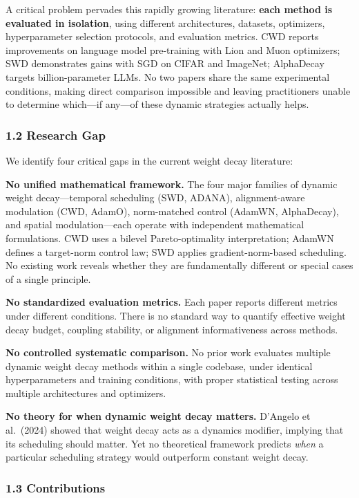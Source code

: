 \documentclass[
]{article}
\begin{document}
A critical problem pervades this rapidly growing literature:
\textbf{each method is evaluated in isolation}, using different
architectures, datasets, optimizers, hyperparameter selection protocols,
and evaluation metrics. CWD reports improvements on language model
pre-training with Lion and Muon optimizers; SWD demonstrates gains with
SGD on CIFAR and ImageNet; AlphaDecay targets billion-parameter LLMs. No
two papers share the same experimental conditions, making direct
comparison impossible and leaving practitioners unable to determine
which---if any---of these dynamic strategies actually helps.

\hypertarget{research-gap}{%
\subsubsection{1.2 Research Gap}\label{research-gap}}

We identify four critical gaps in the current weight decay literature:

\textbf{No unified mathematical framework.} The four major families of
dynamic weight decay---temporal scheduling (SWD, ADANA), alignment-aware
modulation (CWD, AdamO), norm-matched control (AdamWN, AlphaDecay), and
spatial modulation---each operate with independent mathematical
formulations. CWD uses a bilevel Pareto-optimality interpretation;
AdamWN defines a target-norm control law; SWD applies
gradient-norm-based scheduling. No existing work reveals whether they
are fundamentally different or special cases of a single principle.

\textbf{No standardized evaluation metrics.} Each paper reports
different metrics under different conditions. There is no standard way
to quantify effective weight decay budget, coupling stability, or
alignment informativeness across methods.

\textbf{No controlled systematic comparison.} No prior work evaluates
multiple dynamic weight decay methods within a single codebase, under
identical hyperparameters and training conditions, with proper
statistical testing across multiple architectures and optimizers.

\textbf{No theory for when dynamic weight decay matters.} D'Angelo et
al.~(2024) showed that weight decay acts as a dynamics modifier,
implying that its scheduling should matter. Yet no theoretical framework
predicts \emph{when} a particular scheduling strategy would outperform
constant weight decay.

\hypertarget{contributions}{%
\subsubsection{1.3 Contributions}\label{contributions}}
\end{document}
